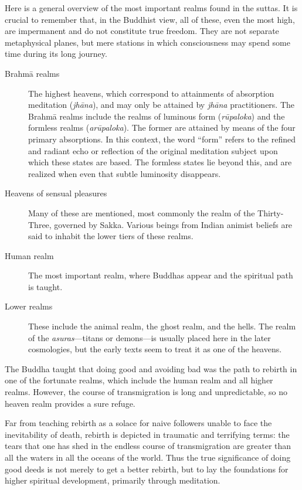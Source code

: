 \documentclass[12pt,openany]{book}%
\begin{document}
Here is a general overview of the most important realms found in the suttas. It is crucial to remember that, in the Buddhist view, all of these, even the most high, are impermanent and do not constitute true freedom. They are not separate metaphysical planes, but mere stations in which consciousness may spend some time during its long journey.

\begin{description}%
\item[\textsanskrit{Brahmā} realms] The highest heavens, which correspond to attainments of absorption meditation (\textit{\textsanskrit{jhāna}}), and may only be attained by \textit{\textsanskrit{jhāna}} practitioners. The \textsanskrit{Brahmā} realms include the realms of luminous form (\textit{\textsanskrit{rūpaloka}}) and the formless realms (\textit{\textsanskrit{arūpaloka}}). The former are attained by means of the four primary absorptions. In this context, the word “form” refers to the refined and radiant echo or reflection of the original meditation subject upon which these states are based. The formless states lie beyond this, and are realized when even that subtle luminosity disappears.%
\item[Heavens of sensual pleasures] Many of these are mentioned, most commonly the realm of the Thirty-Three, governed by Sakka. Various beings from Indian animist beliefs are said to inhabit the lower tiers of these realms.%
\item[Human realm] The most important realm, where Buddhas appear and the spiritual path is taught.%
\item[Lower realms] These include the animal realm, the ghost realm, and the hells. The realm of the \textit{asuras}—titans or demons—is usually placed here in the later cosmologies, but the early texts seem to treat it as one of the heavens.%
\end{description}

The Buddha taught that doing good and avoiding bad was the path to rebirth in one of the fortunate realms, which include the human realm and all higher realms. However, the course of transmigration is long and unpredictable, so no heaven realm provides a sure refuge.

Far from teaching rebirth as a solace for naive followers unable to face the inevitability of death, rebirth is depicted in traumatic and terrifying terms: the tears that one has shed in the endless course of transmigration are greater than all the waters in all the oceans of the world. Thus the true significance of doing good deeds is not merely to get a better rebirth, but to lay the foundations for higher spiritual development, primarily through meditation.
\end{document}
